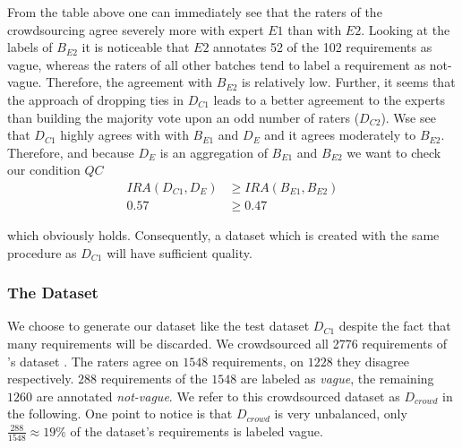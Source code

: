 From the table above one can immediately see that the raters of the crowdsourcing agree severely more with expert $E1$ than with $E2$.
Looking at the labels of $B_{E2}$ it is noticeable that $E2$ annotates 52 of the 102 requirements as vague, whereas the raters of all other batches tend to label a requirement as not-vague.
Therefore, the agreement with $B_{E2}$ is relatively low.
Further, it seems that the approach of dropping ties in $D_{C1}$ leads to a better agreement to the experts than building the majority vote upon an odd number of raters ($D_{C2}$).
Wse see that $D_{C1}$ highly agrees with with $B_{E1}$ and $D_{E}$ and it agrees moderately to $B_{E2}$.
Therefore, and because $D_{E}$ is an aggregation of $B_{E1}$ and $B_{E2}$ we want to check our condition $QC$
\begin{equation}
    \begin{aligned}
        IRA(D_{C1}, D_E) &\ge IRA(B_{E1}, B_{E2})\\
        0.57 &\ge 0.47
    \end{aligned}
\end{equation}

which obviously holds.
Consequently, a dataset which is created with the same procedure as $D_{C1}$ will have sufficient quality.

\subsubsection{The Dataset}
We choose to generate our dataset like the test dataset $D_{C1}$ despite the fact that many requirements will be discarded.
We crowdsourced all 2776 requirements of \citeauthor{Kummeth:2020}'s dataset \parencite{Kummeth:2020}.
The raters agree on $1548$ requirements, on $1228$ they disagree respectively.
$288$ requirements of the $1548$ are labeled as \textit{vague}, the remaining $1260$ are annotated \textit{not-vague}.
We refer to this crowdsourced dataset as $D_{crowd}$ in the following.
One point to notice is that $D_{crowd}$ is very unbalanced, only $\frac{288}{1548} \approx 19\%$ of the dataset's requirements is labeled vague.
